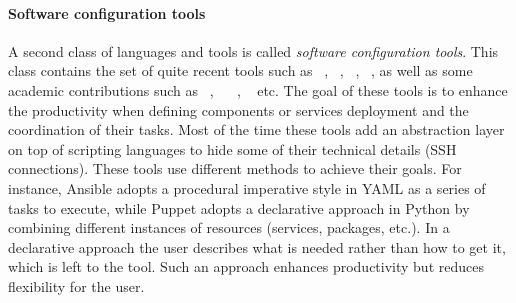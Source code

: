 \paragraph{Software configuration tools}
A second class of languages and tools is called \emph{software configuration tools}. This class contains the set of quite recent tools such as \ansible~\cite{ansible:web}, \puppet~\cite{puppet:web}, \chef~\cite{chef:web},
\salt~\cite{salt:web}, as well as some academic contributions such as \smartfrog~\cite{10.1145/1496909.1496915}, \engage~\cite{DBLP:conf/pldi/FischerME12} \deployware~\cite{flissi2008ccgrid}, \aeolus~\cite{dicosmo2014ic,dicosmo:hal-01233489} etc. The goal of these tools is to enhance the productivity when defining components or services deployment and the coordination of their tasks. Most of the time these tools add an abstraction layer on top of scripting languages to hide some of their technical details (\eg SSH connections). These tools use different methods to achieve their goals. For instance, Ansible adopts a procedural imperative style in YAML as a series of tasks to execute, while Puppet adopts a declarative approach in Python by combining different instances of resources (\ie services, packages, etc.). In a declarative approach the user describes what is needed rather than how to get it, which is left to the tool. Such an approach enhances productivity but reduces flexibility for the user.

